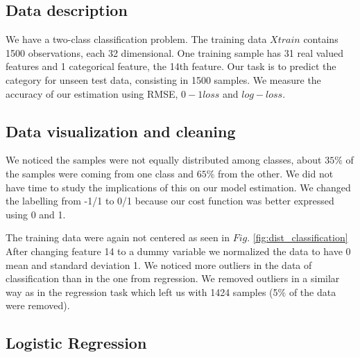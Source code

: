 \subsection{Data description}
We have a two-class classification problem. The training data $Xtrain$ contains 1500 observations, each 32 dimensional. One training sample has 31 real valued features and 1 categorical feature, the 14th feature. Our task is to predict the category for unseen test data, consisting in 1500 samples. We measure the accuracy of our estimation using RMSE, $0-1 loss$ and $log-loss$. 

\subsection{Data visualization and cleaning}
We noticed the samples were not equally distributed among classes, about $35\%$ of the samples were coming from one class and $65\%$ from the other. We did not have time to study the implications of this on our model estimation. We changed the labelling from -1/1 to 0/1 because our cost function was better expressed using 0 and 1.

The training data were again not centered as seen in $Fig.$ \ref{fig:dist_classification}
After changing feature 14 to a dummy variable we normalized the data to have 0 mean and standard deviation 1. We noticed more outliers in the data of classification than in the one from regression. We removed outliers in a similar way as in the regression task which left us with 1424 samples (5$\%$ of the data were removed).

\subsection{Logistic Regression}

